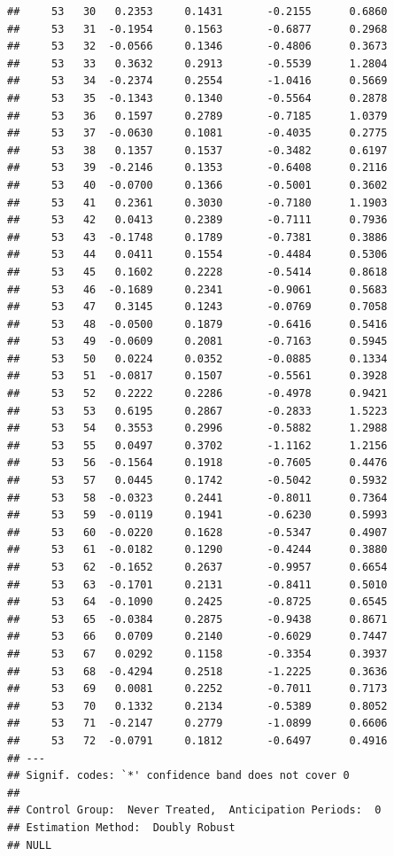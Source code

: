\documentclass[
]{article}
\begin{document}
\begin{verbatim}
##     53   30   0.2353     0.1431       -0.2155      0.6860  
##     53   31  -0.1954     0.1563       -0.6877      0.2968  
##     53   32  -0.0566     0.1346       -0.4806      0.3673  
##     53   33   0.3632     0.2913       -0.5539      1.2804  
##     53   34  -0.2374     0.2554       -1.0416      0.5669  
##     53   35  -0.1343     0.1340       -0.5564      0.2878  
##     53   36   0.1597     0.2789       -0.7185      1.0379  
##     53   37  -0.0630     0.1081       -0.4035      0.2775  
##     53   38   0.1357     0.1537       -0.3482      0.6197  
##     53   39  -0.2146     0.1353       -0.6408      0.2116  
##     53   40  -0.0700     0.1366       -0.5001      0.3602  
##     53   41   0.2361     0.3030       -0.7180      1.1903  
##     53   42   0.0413     0.2389       -0.7111      0.7936  
##     53   43  -0.1748     0.1789       -0.7381      0.3886  
##     53   44   0.0411     0.1554       -0.4484      0.5306  
##     53   45   0.1602     0.2228       -0.5414      0.8618  
##     53   46  -0.1689     0.2341       -0.9061      0.5683  
##     53   47   0.3145     0.1243       -0.0769      0.7058  
##     53   48  -0.0500     0.1879       -0.6416      0.5416  
##     53   49  -0.0609     0.2081       -0.7163      0.5945  
##     53   50   0.0224     0.0352       -0.0885      0.1334  
##     53   51  -0.0817     0.1507       -0.5561      0.3928  
##     53   52   0.2222     0.2286       -0.4978      0.9421  
##     53   53   0.6195     0.2867       -0.2833      1.5223  
##     53   54   0.3553     0.2996       -0.5882      1.2988  
##     53   55   0.0497     0.3702       -1.1162      1.2156  
##     53   56  -0.1564     0.1918       -0.7605      0.4476  
##     53   57   0.0445     0.1742       -0.5042      0.5932  
##     53   58  -0.0323     0.2441       -0.8011      0.7364  
##     53   59  -0.0119     0.1941       -0.6230      0.5993  
##     53   60  -0.0220     0.1628       -0.5347      0.4907  
##     53   61  -0.0182     0.1290       -0.4244      0.3880  
##     53   62  -0.1652     0.2637       -0.9957      0.6654  
##     53   63  -0.1701     0.2131       -0.8411      0.5010  
##     53   64  -0.1090     0.2425       -0.8725      0.6545  
##     53   65  -0.0384     0.2875       -0.9438      0.8671  
##     53   66   0.0709     0.2140       -0.6029      0.7447  
##     53   67   0.0292     0.1158       -0.3354      0.3937  
##     53   68  -0.4294     0.2518       -1.2225      0.3636  
##     53   69   0.0081     0.2252       -0.7011      0.7173  
##     53   70   0.1332     0.2134       -0.5389      0.8052  
##     53   71  -0.2147     0.2779       -1.0899      0.6606  
##     53   72  -0.0791     0.1812       -0.6497      0.4916  
## ---
## Signif. codes: `*' confidence band does not cover 0
## 
## Control Group:  Never Treated,  Anticipation Periods:  0
## Estimation Method:  Doubly Robust
## NULL
\end{verbatim}
\end{document}
